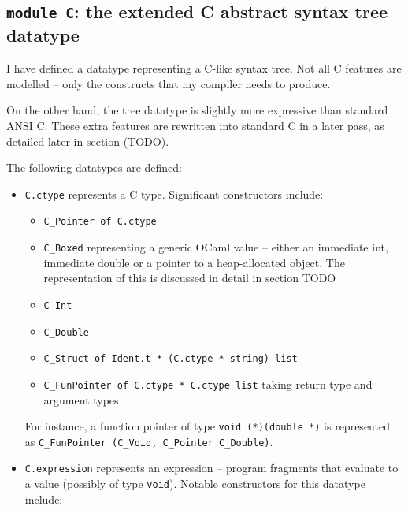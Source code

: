 \documentclass[12pt,a4paper,twoside,openright]{report}
\begin{document}
\subsection{\texttt{module C}: the extended C abstract syntax tree datatype}

I have defined a datatype representing a C-like syntax tree. Not all C features
are modelled -- only the constructs that my compiler needs to produce.

On the other hand, the tree datatype is slightly more expressive than standard
ANSI C. These extra features are rewritten into standard C in a later pass, as
detailed later in section (TODO).

The following datatypes are defined:

\begin{itemize}
  \item
    \lstinline!C.ctype! represents a C type. Significant constructors include:

    \begin{itemize}
        \item \lstinline!C_Pointer of C.ctype!
        \item \lstinline!C_Boxed! representing a generic OCaml value -- either
            an immediate int, immediate double or a pointer to a heap-allocated
            object. The representation of this is discussed in detail in
            section TODO
        \item \lstinline!C_Int!
        \item \lstinline!C_Double!
        \item \lstinline!C_Struct of Ident.t * (C.ctype * string) list!
        \item \lstinline!C_FunPointer of C.ctype * C.ctype list! taking return
            type and argument types
    \end{itemize}

    For instance, a function pointer of type \lstinline!void (*)(double *)! is
    represented as \lstinline!C_FunPointer (C_Void, C_Pointer C_Double)!.
  \item
    \lstinline!C.expression! represents an expression -- program fragments that
    evaluate to a value (possibly of type \lstinline!void!). Notable
    constructors for this datatype include:


\end{itemize}
\end{document}
